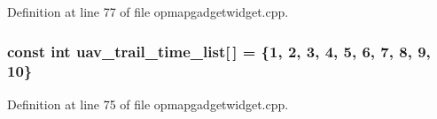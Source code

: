 \-Definition at line 77 of file opmapgadgetwidget.\-cpp.

\hypertarget{group___o_p_map_plugin_ga42a1c15ba77f6bec7efc5e15cc2d7a6b}{
\subsubsection[{uav\-\_\-trail\-\_\-time\-\_\-list}]{\setlength{\rightskip}{0pt plus 5cm}const int {\bf uav\-\_\-trail\-\_\-time\-\_\-list}\mbox{[}$\,$\mbox{]} = \{1, 2, 3, 4, 5, 6, 7, 8, 9, 10\}}}\label{group___o_p_map_plugin_ga42a1c15ba77f6bec7efc5e15cc2d7a6b}


\-Definition at line 75 of file opmapgadgetwidget.\-cpp.




